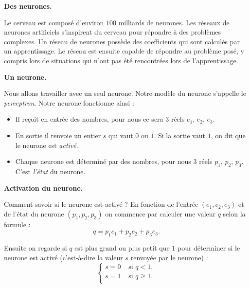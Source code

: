\documentclass[10pt,class=report,crop=false]{standalone}
\begin{document}

\begin{cours}[Neurone]
	

\textbf{Des neurones.}

Le cerveau est composé d'environ $100$ milliards de neurones.
Les réseaux de neurones artificiels s'inspirent du cerveau pour répondre à des problèmes complexes.
Un réseau de neurones possède des coefficients qui sont calculés par un apprentissage. Le réseau est ensuite capable de répondre au problème posé, y compris lors de situations qui n'ont pas été rencontrées lors de l'apprentissage.

\medskip

\textbf{Un neurone.}

Nous allons travailler avec un seul neurone. Notre modèle du neurone s'appelle le \emph{perceptron}.
Notre neurone fonctionne ainsi :
\begin{itemize}
	\item Il reçoit en entrée des nombres, pour nous ce sera $3$ réels $e_1$, $e_2$, $e_3$.
	\item En sortie il renvoie un entier $s$ qui vaut $0$ ou $1$. Si la sortie vaut $1$, on dit que le neurone est \emph{activé}.
	\item Chaque neurone est déterminé par des nombres, pour nous $3$ réels $p_1$, $p_2$, $p_3$. C'est \emph{l'état} du neurone.	
\end{itemize}


\medskip

\textbf{Activation du neurone.}
	
Comment savoir si le neurone est activé ? 
En fonction de l'entrée $(e_1,e_2,e_3)$ et de l'état du neurone $(p_1,p_2,p_3)$ 
on commence par calculer une valeur $q$ selon la formule :
$$q = p_1 e_1 + p_2e_2+p_3e_3.$$

Ensuite on regarde si $q$ est plus grand ou plus petit que $1$ pour déterminer si le neurone
est activé (c'est-à-dire la valeur $s$ renvoyée par le neurone) :
$$\left\{ 
\begin{array}{rl}
s = 0  & \text{ si } q < 1, \\ 	
s = 1 & \text{ si } q \ge 1. \\
\end{array}
\right.$$


\end{cours}
\end{document}
